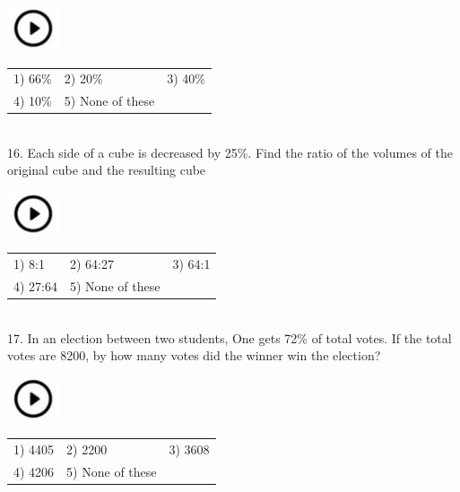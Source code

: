 \documentclass{article}
\begin{document}
\noindent   \includegraphics*[width=0.60in, height=0.52in]{images/image1}  
\begin{tabular}{p{1.7in} p{1.6in} p{1.6in}} \\ 
	1) 66\%        &   2) 20\%     &  3) 40\%     \\
	4) 10\%   &      5) None of these\\
\end{tabular}
                                                         

\noindent 

\noindent 

\noindent \\


16. Each side of a cube is decreased by 25\%. Find the ratio of the volumes of the original cube  and the resulting cube

\noindent  \includegraphics*[width=0.60in, height=0.52in]{images/image1} 
\begin{tabular}{p{1.7in} p{1.6in} p{1.6in}} \\ 
	1) 8:1       &  2) 64:27       &  3) 64:1     \\
	4) 27:64   &       5) None of these \\
\end{tabular}
                                                            

\noindent \\
17. In an election between two students, One gets 72\% of total votes. If the total votes are 8200, by how many votes did the winner win the election?

\noindent   \includegraphics*[width=0.60in, height=0.52in]{images/image1}  
\begin{tabular}{p{1.7in} p{1.6in} p{1.6in}} \\ 
	 1) 4405      &  2) 2200       &  3) 3608      \\
	4) 4206   &       5) None of these \\
\end{tabular}
\end{document}
